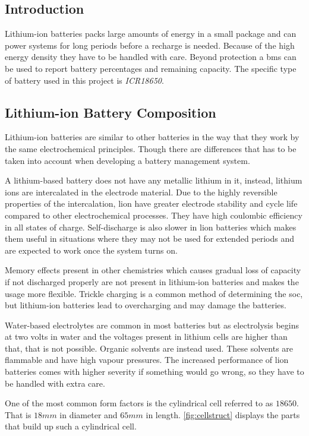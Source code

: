 
\subsection{Introduction}
Lithium-ion batteries packs large amounts of energy in a small package and can power systems for long periods before a recharge is needed. Because of the high energy density they have to be handled with care. Beyond protection a \gls{bms} can be used to report battery percentages and remaining capacity. The specific type of battery used in this project is \emph{ICR18650}.


\subsection{Lithium-ion Battery Composition}
Lithium-ion batteries are similar to other batteries in the way that they work by the same electrochemical principles. Though there are differences that has to be taken into account when developing a battery management system.

A lithium-based battery does not have any metallic lithium in it, instead, lithium ions are intercalated in the electrode material. Due to the highly reversible properties of the intercalation, \gls{lion} have greater electrode stability and cycle life compared to other electrochemical processes. They have high coulombic efficiency in all states of charge. Self-discharge is also slower in \gls{lion} batteries which makes them useful in situations where they may not be used for extended periods and are expected to work once the system turns on.

Memory effects present in other chemistries which causes gradual loss of capacity if not discharged properly are not present in lithium-ion batteries and makes the usage more flexible. Trickle charging is a common method of determining the \gls{soc}, but lithium-ion batteries lead to overcharging and may damage the batteries.

Water-based electrolytes are common in most batteries but as electrolysis begins at two volts in water and the voltages present in lithium cells are higher than that, that is not possible. Organic solvents are instead used. These solvents are flammable and have high vapour pressures. The increased performance of \gls{lion} batteries comes with higher severity if something would go wrong, so they have to be handled with extra care.

One of the most common form factors is the cylindrical cell referred to as $18650$. That is $18mm$ in diameter and $65mm$ in length\cite[p. 26-27]{book}. \autoref{fig:cellstruct} displays the parts that build up such a cylindrical cell.

